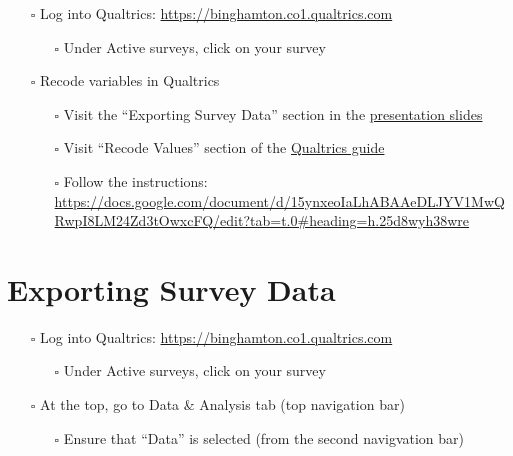 \documentclass[
  english,
  letterpaper,
  DIV=11,
  numbers=noendperiod]{scrreprt}
\providecommand{\tightlist}{%
  \setlength{\itemsep}{0pt}\setlength{\parskip}{0pt}}
\begin{document}
\begin{itemize}
\item[$\square$]
  Log into Qualtrics: \url{https://binghamton.co1.qualtrics.com}

  \begin{itemize}
  \tightlist
  \item[$\square$]
    Under Active surveys, click on your survey
  \end{itemize}
\item[$\square$]
  Recode variables in Qualtrics

  \begin{itemize}
  \item[$\square$]
    Visit the ``Exporting Survey Data'' section in the
    \href{https://docs.google.com/presentation/d/1VGnFFuaKgtEzWRYaI04DAT4ebn_Qfxl370Nxmg2KEdc/edit?slide=id.g38c5b5e4629_0_7\#slide=id.g38c5b5e4629_0_7}{presentation
    slides}
  \item[$\square$]
    Visit ``Recode Values'' section of the
    \href{https://www.qualtrics.com/support/survey-platform/survey-module/question-options/recode-values/}{Qualtrics
    guide}
  \item[$\square$]
    Follow the instructions:
    \url{https://docs.google.com/document/d/15ynxeoIaLhABAAeDLJYV1MwQRwpI8LM24Zd3tOwxcFQ/edit?tab=t.0\#heading=h.25d8wyh38wre}
  \end{itemize}
\end{itemize}

\chapter{Exporting Survey Data}\label{exporting-survey-data-2}

\begin{itemize}
\tightlist
\item[$\square$]
  Log into Qualtrics: \url{https://binghamton.co1.qualtrics.com}

  \begin{itemize}
  \tightlist
  \item[$\square$]
    Under Active surveys, click on your survey
  \end{itemize}
\item[$\square$]
  At the top, go to Data \& Analysis tab (top navigation bar)

  \begin{itemize}
  \tightlist
  \item[$\square$]
    Ensure that ``Data'' is selected (from the second navigvation bar)
  \end{itemize}
\end{itemize}
\end{document}
